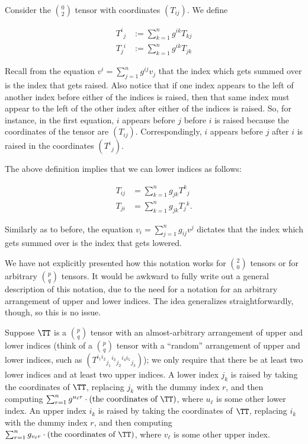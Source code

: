 \begin{defn}
    Consider the $\binom{0}{2}$ tensor with coordinates $(T_{ij})$. We define
    
    \begin{align*}
        T^i{}_j &:= \sum_{k = 1}^n g^{ik} T_{kj} \\
        T_j{}^i &:= \sum_{k = 1}^n g^{ik} T_{jk}
    \end{align*}
    
    Recall from the equation $v^i = \sum_{j = 1}^n g^{ij} v_j$ that the index which gets summed over is the index that gets raised. Also notice that if one index appears to the left of another index before either of the indices is raised, then that same index must appear to the left of the other index after either of the indices is raised. So, for instance, in the first equation, $i$ appears before $j$ before $i$ is raised because the coordinates of the tensor are $(T_{ij})$. Correspondingly, $i$ appears before $j$ after $i$ is raised in the coordinates $(T^i{}_j)$.
        
    The above definition implies that we can lower indices as follows:
    
    \begin{align*}
        T_{ij} &= \sum_{k = 1}^n g_{jk} T^k{}_j \\
        T_{ji} &= \sum_{k = 1}^n g_{jk} T_j{}^k.
    \end{align*}
    
    Similarly as to before, the equation $v_i = \sum_{j = 1}^n g_{ij} v^j$ dictates that the index which gets summed over is the index that gets lowered.
    
    We have not explicitly presented how this notation works for $\binom{2}{0}$ tensors or for arbitrary $\binom{p}{q}$ tensors. It would be awkward to fully write out a general description of this notation, due to the need for a notation for an arbitrary arrangement of upper and lower indices. The idea generalizes straightforwardly, though, so this is no issue. 
    
    Suppose $\TT$ is a $\binom{p}{q}$ tensor with an almost-arbitrary arrangement of upper and lower indices (think of a $\binom{p}{q}$ tensor with a ``random'' arrangement of upper and lower indices, such as $(T^{i_1 i_2}{}_{j_1}{}^{i_3}{}_{j_2}{}^{i_4 i_5}{}_{j_3})$); we only require that there be at least two lower indices and at least two upper indices. A lower index $j_k$ is raised by taking the coordinates of $\TT$, replacing $j_k$ with the dummy index $r$, and then computing $\sum_{r = 1}^n g^{u_\ell r} \cdot (\text{the coordinates of $\TT$})$, where $u_\ell$ is some other lower index. An upper index $i_k$ is raised by taking the coordinates of $\TT$, replacing $i_k$ with the dummy index $r$, and then computing $\sum_{r = 1}^n g_{v_\ell r} \cdot (\text{the coordinates of $\TT$})$, where $v_\ell$ is some other upper index.
\end{defn}
    

